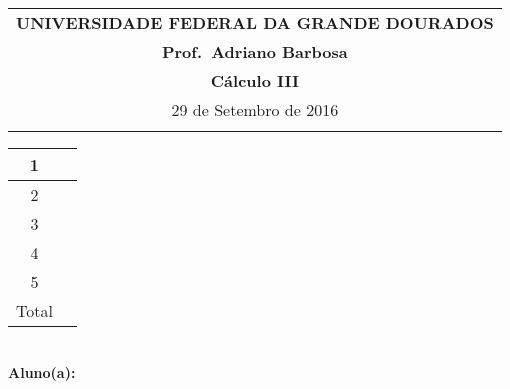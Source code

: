 \documentclass[a4paper,5pt]{amsbook}
\begin{document}
\thispagestyle{empty}
\begin{minipage}[b]{0.45\linewidth}
\begin{tabular}{c}
\toprule{}
{{\bf UNIVERSIDADE FEDERAL DA GRANDE DOURADOS}}\\
{{\bf Prof.\ Adriano Barbosa}}\\



{{\bf C\'alculo III}}\\

\midrule{}
\hspace{8cm}29 de Setembro de 2016 \\
\bottomrule{}
\end{tabular}
%
\end{minipage} \hfill
\begin{minipage}[b]{0.58\linewidth}
\begin{flushright}
\def\arraystretch{1.2}
\begin{tabular}{|c|c|}  %
\hline\hline  %
1 & \hspace{1.2cm} \\
\hline  %
2& \\
\hline  %
3& \\
\hline  %
4&  \\
\hline  %
5&  \\
\hline  %
{\small Total}&  \\
\hline\hline  %
\end{tabular}
\end{flushright}
\end{minipage} \hfill
\vspace{0.3cm}\\
{\bf Aluno(a):}\dotfill{} \\  %
\end{document}
